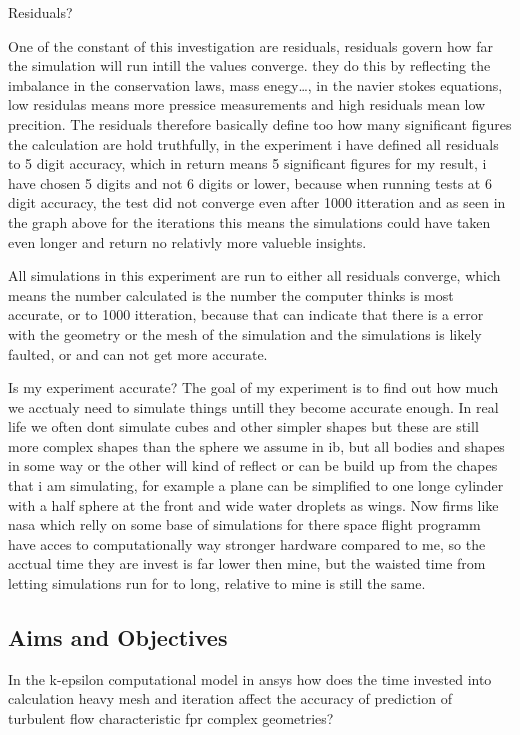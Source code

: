 \documentclass[12pt,a4paper]{article}
\begin{document}
Residuals?

One of the constant of this investigation are residuals, residuals govern how far the simulation will run intill the values converge. they do this by reflecting the imbalance in the conservation laws, mass enegy…, in the navier stokes equations, low residulas means more pressice measurements and high residuals mean low precition. The residuals therefore basically define too how many significant figures the calculation are hold truthfully, in the experiment i have defined all residuals to 5 digit accuracy, which in return means 5 significant figures for my result, i have chosen 5 digits and not 6 digits or lower, because when running tests at 6 digit accuracy, the test did not converge even after 1000 itteration and as seen in the graph above for the iterations this means the simulations could have taken even longer and return no relativly more valueble insights. 

All simulations in this experiment are run to either all residuals converge, which means the number calculated is the number the computer thinks is most accurate, or to 1000 itteration, because that can indicate that there is a error with the geometry or the mesh of the simulation and the simulations is likely faulted, or and can not get more accurate.

Is my experiment accurate?
The goal of my experiment is to find out how much we acctualy need to simulate things untill they become accurate enough. In real life we often dont simulate cubes and other simpler shapes but these are still more complex shapes than the sphere we assume in ib, but all bodies and shapes in some way or the other will kind of reflect or can be build up from the chapes that i am simulating, for example a plane can be simplified to one longe cylinder with a half sphere at the front and wide water droplets as wings. Now firms like nasa which relly on some base of simulations for there space flight programm have acces to computationally way stronger hardware compared to me, so the acctual time they are invest is far lower then mine, but the waisted time from letting simulations run for to long, relative to mine is still the same.


\subsection{Aims and Objectives}

In the k-epsilon computational model in ansys how does the time invested into calculation heavy mesh and iteration affect the accuracy of prediction of turbulent flow characteristic fpr complex geometries?
\end{document}
